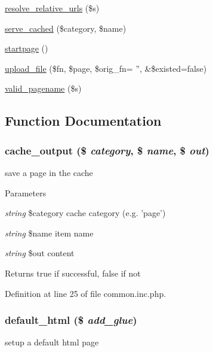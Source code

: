 \begin{DoxyCompactItemize}
\item 
\hyperlink{common_8inc_8php_a81eb70073067db81ab43829870f15e6d}{resolve\_\-relative\_\-urls} (\$s)
\item 
\hyperlink{common_8inc_8php_aac90387dcab722e243df2d083f8d6a00}{serve\_\-cached} (\$category, \$name)
\item 
\hyperlink{common_8inc_8php_a0a3ee1e9beca572266648f17b9c4c75f}{startpage} ()
\item 
\hyperlink{common_8inc_8php_a4659077c34b709eec75f9897ea07e55a}{upload\_\-file} (\$fn, \$page, \$orig\_\-fn= '', \&\$existed=false)
\item 
\hyperlink{common_8inc_8php_a0ef613d233a6e62f7e631b8dfcd710bf}{valid\_\-pagename} (\$s)
\end{DoxyCompactItemize}


\subsection{Function Documentation}
\hypertarget{common_8inc_8php_a6cceb5c6a3c421c18e925515c78f6dfd}{
\subsubsection[{cache\_\-output}]{\setlength{\rightskip}{0pt plus 5cm}cache\_\-output (\$ {\em category}, \/  \$ {\em name}, \/  \$ {\em out})}}
\label{common_8inc_8php_a6cceb5c6a3c421c18e925515c78f6dfd}
save a page in the cache


\begin{DoxyParams}{Parameters}
\item[{\em string}]\$category cache category (e.g. 'page') \item[{\em string}]\$name item name \item[{\em string}]\$out content \end{DoxyParams}
\begin{DoxyReturn}{Returns}
true if successful, false if not 
\end{DoxyReturn}


Definition at line 25 of file common.inc.php.

\hypertarget{common_8inc_8php_a8916cb6ec34ceeb3f48c86655c305974}{
\subsubsection[{default\_\-html}]{\setlength{\rightskip}{0pt plus 5cm}default\_\-html (\$ {\em add\_\-glue})}}
\label{common_8inc_8php_a8916cb6ec34ceeb3f48c86655c305974}
setup a default html page


